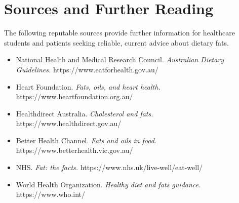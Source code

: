 \section*{Sources and Further Reading}
The following reputable sources provide further information for healthcare students and patients seeking reliable, current advice about dietary fats.
\begin{itemize}
    \item National Health and Medical Research Council. \textit{Australian Dietary Guidelines.} https://www.eatforhealth.gov.au/
    \item Heart Foundation. \textit{Fats, oils, and heart health.} https://www.heartfoundation.org.au/
    \item Healthdirect Australia. \textit{Cholesterol and fats.} https://www.healthdirect.gov.au/
    \item Better Health Channel. \textit{Fats and oils in food.} https://www.betterhealth.vic.gov.au/
    \item NHS. \textit{Fat: the facts.} https://www.nhs.uk/live-well/eat-well/
    \item World Health Organization. \textit{Healthy diet and fats guidance.} https://www.who.int/
\end{itemize}
